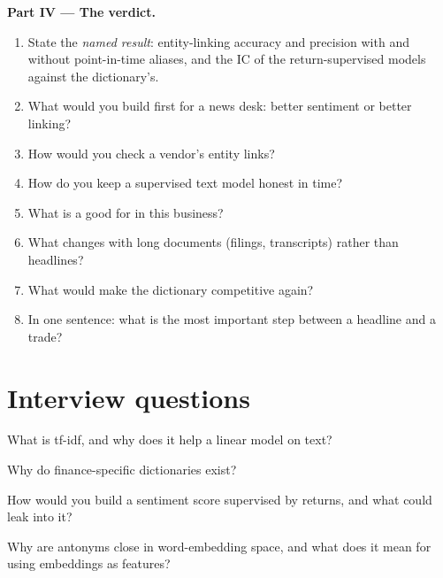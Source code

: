 \begin{problem}
\medskip\noindent\textbf{Part IV --- The verdict.}
\begin{enumerate}[resume]
\item State the \emph{named result}: entity-linking accuracy and precision with and without point-in-time aliases, and the
IC of the return-supervised models against the dictionary's.
\item What would you build first for a news desk: better sentiment or better linking?
\item How would you check a vendor's entity links?
\item How do you keep a supervised text model honest in time?
\item What is a  good for in this business?
\item What changes with long documents (filings, transcripts) rather than headlines?
\item What would make the dictionary competitive again?
\item In one sentence: what is the most important step between a headline and a trade?
\end{enumerate}
\end{problem}

\section{Interview questions}

\begin{interviewq}\label{iq:ml:text-from-bag-of-words-to-embeddings:1}
What is tf-idf, and why does it help a linear model on text?
\end{interviewq}

\begin{interviewq}\label{iq:ml:text-from-bag-of-words-to-embeddings:2}
Why do finance-specific dictionaries exist?
\end{interviewq}

\begin{interviewq}\label{iq:ml:text-from-bag-of-words-to-embeddings:3}
How would you build a sentiment score supervised by returns, and what could leak into it?
\end{interviewq}

\begin{interviewq}\label{iq:ml:text-from-bag-of-words-to-embeddings:4}
Why are antonyms close in word-embedding space, and what does it mean for using embeddings as features?
\end{interviewq}

